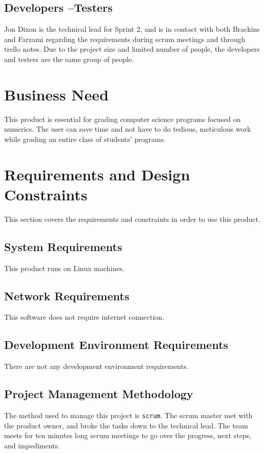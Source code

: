 
\subsection{Developers --Testers}
Jon Dixon is the technical lead for Sprint 2, and is in contact with both Brackins and Farzami regarding the requirements during scrum meetings and through trello notes. Due to the project size and limited number of people, the developers and testers are the same group of people. 

\section{Business Need}
This product is essential for grading computer science programs focused on numerics. The user can save time and not have to do tedious, meticulous work while grading an entire class of students' programs.  

\section{Requirements and Design Constraints}
This section covers the requirements and constraints in order to use this product. 

\subsection{System  Requirements}
This product runs on Linux machines. 

\subsection{Network Requirements}
This software does not require internet connection. 

\subsection{Development Environment Requirements}
There are not any development environment requirements.

\subsection{Project  Management Methodology}
The method used to manage this project is {\tt scrum}. The scrum master met with the product owner, and broke the tasks down to the technical lead. The team meets for ten minutes long scrum meetings to go over the progress, next steps, and impediments. 
 
